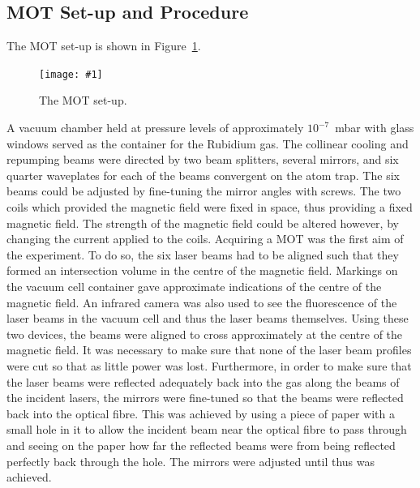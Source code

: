 \documentclass[twocolumn]{article}
\newcommand{\insertFigure}[1]{%
   \texttt{[image: \#1]}%
}
\begin{document}
\subsection{MOT Set-up and Procedure}
The MOT set-up is shown in Figure~\ref{fig:MOT}.
\begin{figure} [!h]
	\centering
	\insertFigure{Images/MOT.png}
	\caption{The MOT set-up.\cite{manual}}
	\label{fig:MOT}
\end{figure}
A vacuum chamber held at pressure levels of approximately $10^{-7}$~mbar with glass windows served as the container for the Rubidium gas. The collinear cooling and repumping beams were directed by two beam splitters, several mirrors, and six quarter waveplates for each of the beams convergent on the atom trap. The six beams could be adjusted by fine-tuning the mirror angles with screws. The two coils which provided the magnetic field were fixed in space, thus providing a fixed magnetic field. The strength of the magnetic field could be altered however, by changing the current applied to the coils. Acquiring a MOT was the first aim of the experiment. To do so, the six laser beams had to be aligned such that they formed an intersection volume in the centre of the magnetic field. Markings on the vacuum cell container gave approximate indications of the centre of the magnetic field. An infrared camera was also used to see the fluorescence of the laser beams in the vacuum cell and thus the laser beams themselves. Using these two devices, the beams were aligned to cross approximately at the centre of the magnetic field. It was necessary to make sure that none of the laser beam profiles were cut so that as little power was lost. Furthermore, in order to make sure that the laser beams were reflected adequately back into the gas along the beams of the incident lasers, the mirrors were fine-tuned so that the beams were reflected back into the optical fibre. This was achieved by using a piece of paper with a small hole in it to allow the incident beam near the optical fibre to pass through and seeing on the paper how far the reflected beams were from being reflected perfectly back through the hole. The mirrors were adjusted until thus was achieved. \\
\end{document}
